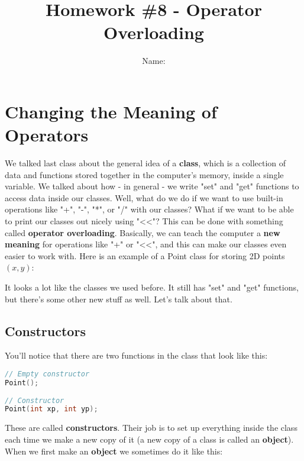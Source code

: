 \documentclass[a4paper,12pt]{article} %
\title{\textbf{Homework \#8 - Operator Overloading}}
\author{Name: }
\date{} %
\begin{document}
\maketitle %

\section{Changing the Meaning of Operators}

We talked last class about the general idea of a \textbf{class}, which is a collection of data and functions stored together in the computer's memory, inside a single variable. We talked about how - in general - we write "set" and "get" functions to access data inside our classes. Well, what do we do if we want to use built-in operations like "+", "-", "*", or "/" with our classes? What if we want to be able to print our classes out nicely using "\textless\textless"? This can be done with something called \textbf{operator overloading}. Basically, we can teach the computer a \textbf{new meaning} for operations like "+" or "\textless\textless", and this can make our classes even easier to work with. Here is an example of a Point class for storing 2D points $(x,y)$:

\vspace{5mm}


\noindent
It looks a lot like the classes we used before. It still has "set" and "get" functions, but there's some other new stuff as well. Let's talk about that.

\subsection{Constructors}

You'll notice that there are two functions in the class that look like this:

\vspace{5mm}
\begin{lstlisting}[language=C++]
// Empty constructor
Point();
    
// Constructor
Point(int xp, int yp);
\end{lstlisting}

\noindent
These are called \textbf{constructors}. Their job is to set up everything inside the class each time we make a new copy of it (a new copy of a class is called an \textbf{object}). When we first make an \textbf{object} we sometimes do it like this:
\end{document}

